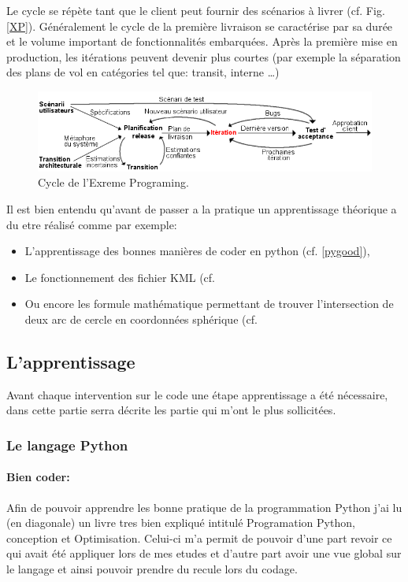 Le cycle se répète tant que le client peut fournir des scénarios à livrer (cf. Fig. \vref{XP}). Généralement le cycle de la première livraison se caractérise par sa durée et le volume important de fonctionnalités embarquées. Après la première mise en production, les itérations peuvent devenir plus courtes (par exemple la séparation des plans de vol en catégories tel que: transit, interne …)
\begin{figure}
\center
\includegraphics[width=15cm]{images/xp.png}
\caption{Cycle de l'Exreme Programing.}
\label{XP}
\end{figure}

Il est bien entendu qu'avant de passer a la pratique un apprentissage théorique a du etre réalisé comme par exemple:
\begin{itemize}
\item L'apprentissage des bonnes manières de coder en python (cf. \vref{pygood}),
\item Le fonctionnement des fichier KML (cf. %
\item Ou encore les formule mathématique permettant de trouver l'intersection de deux arc de cercle en coordonnées sphérique (cf. %
\end{itemize}
    \subsection{L'apprentissage}
Avant chaque intervention sur le code une étape apprentissage a été nécessaire, dans cette partie serra décrite les partie qui m'ont le plus sollicitées.

        \subsubsection{Le langage Python}
            \paragraph{Bien coder:\label{pygood}}
Afin de pouvoir apprendre les bonne pratique de la programmation Python\cite{pybook} j'ai lu (en diagonale) un livre tres bien expliqué intitulé Programation Python, conception et Optimisation. Celui-ci m'a permit de pouvoir d'une part revoir ce qui avait été appliquer lors de mes etudes et d'autre part avoir une vue global sur le langage et ainsi pouvoir prendre du recule lors du codage.

